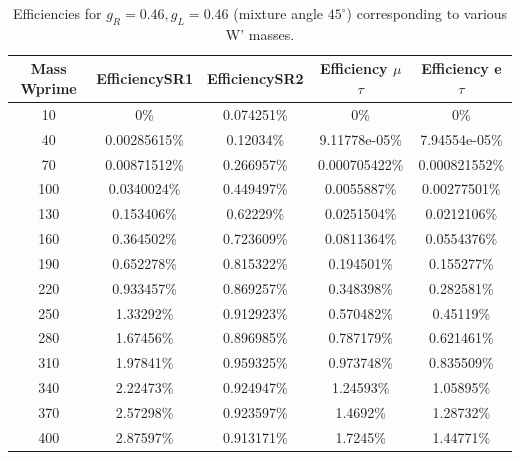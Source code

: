 \begin{table}[htb]
  \centering
  \begin{tabular}{|ccccc|}
    \hline 
    Mass Wprime & EfficiencySR1 & EfficiencySR2 & Efficiency $\mu$$\tau$ & Efficiency e $\tau$ \\
    \hline 
    10& 0\%& 0.074251\%& 0\%& 0\%\\ 
    40& 0.00285615\%& 0.12034\%& 9.11778e-05\%& 7.94554e-05\%\\ 
    70& 0.00871512\%& 0.266957\%& 0.000705422\%& 0.000821552\%\\ 
    100& 0.0340024\%& 0.449497\%& 0.0055887\%& 0.00277501\%\\ 
    130& 0.153406\%& 0.62229\%& 0.0251504\%& 0.0212106\%\\ 
    160& 0.364502\%& 0.723609\%& 0.0811364\%& 0.0554376\%\\ 
    190& 0.652278\%& 0.815322\%& 0.194501\%& 0.155277\%\\ 
    220& 0.933457\%& 0.869257\%& 0.348398\%& 0.282581\%\\ 
    250& 1.33292\%& 0.912923\%& 0.570482\%& 0.45119\%\\ 
    280& 1.67456\%& 0.896985\%& 0.787179\%& 0.621461\%\\ 
    310& 1.97841\%& 0.959325\%& 0.973748\%& 0.835509\%\\ 
    340& 2.22473\%& 0.924947\%& 1.24593\%& 1.05895\%\\ 
    370& 2.57298\%& 0.923597\%& 1.4692\%& 1.28732\%\\ 
    400& 2.87597\%& 0.913171\%& 1.7245\%& 1.44771\%\\ 
    \hline
  \end{tabular}
  \caption{Efficiencies for $g_R=0.46,g_L=0.46$ (mixture angle $45^\circ$) corresponding to various W' masses. \label{eff-mix45} }
\end{table}


